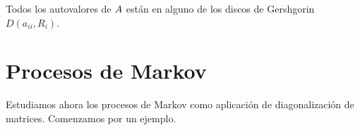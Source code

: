 \begin{teo} Todos los autovalores de $\Ab$ están en alguno de los discos de Gershgorin $D(a_{ii}, R_{i})$.
\end{teo}




%
%
%







\chapter{Procesos de Markov}

Estudiamos ahora los procesos de Markov como aplicación de diagonalización de matrices. Comenzamos por un ejemplo.



